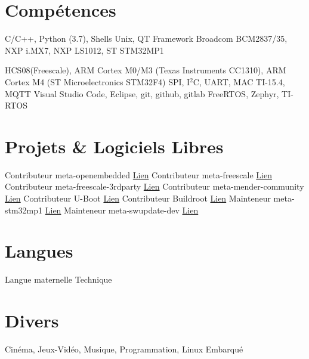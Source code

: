 \documentclass[9pts,a4paper,sans]{moderncv}
\begin{document}
\section{Compétences}
 {C/C++, Python (3.7), Shells Unix, QT Framework} 
 {Broadcom BCM2837/35, NXP i.MX7, NXP LS1012, ST STM32MP1}

 {HCS08(Freescale), ARM Cortex M0/M3 (Texas Instruments CC1310), ARM Cortex M4 (ST Microelectronics STM32F4)}
 {SPI, I$^{2}$C, UART, MAC TI-15.4, MQTT} 
 {Visual Studio Code, Eclipse, git, github, gitlab }
 {FreeRTOS, Zephyr, TI-RTOS}

\section{Projets \& Logiciels Libres}
\cventry{} {Contributeur} {meta-openembedded} {} {\href{https://github.com/openembedded/meta-openembedded/commits?author=jorisoffouga}{Lien}} {}
\cventry{} {Contributeur} {meta-freescale} {} {\href{https://github.com/Freescale/meta-freescale/commits?author=jorisoffouga}{Lien}} {}
\cventry{} {Contributeur} {meta-freescale-3rdparty} {} {\href{https://github.com/Freescale/meta-freescale-3rdparty/commits?author=jorisoffouga}{Lien}} {}
\cventry{} {Contributeur} {meta-mender-community} {} {\href{https://github.com/mendersoftware/meta-mender-community/commits?author=jorisoffouga}{Lien}} {}
\cventry{} {Contributeur} {U-Boot} {} {\href{https://github.com/trini/u-boot/commits?author=jorisoffouga}{Lien}} {}
\cventry{} {Contributeur} {Buildroot} {} {\href{https://github.com/buildroot/buildroot/commits?author=jorisoffouga}{Lien}} {}
\cventry{} {Mainteneur} {meta-stm32mp1} {} {\href{https://github.com/bdx-iot/meta-stm32mp1/commits?author=jorisoffouga}{Lien}} {}
\cventry{} {Mainteneur} {meta-swupdate-dev} {} {\href{https://github.com/bdx-iot/meta-swupdate-dev/commits?author=jorisoffouga}{Lien}} {}

\section{Langues}
 {Langue maternelle}
 {Technique}
 
\section{Divers}
 {Cinéma, Jeux-Vidéo, Musique, Programmation, Linux Embarqué}
\end{document}
